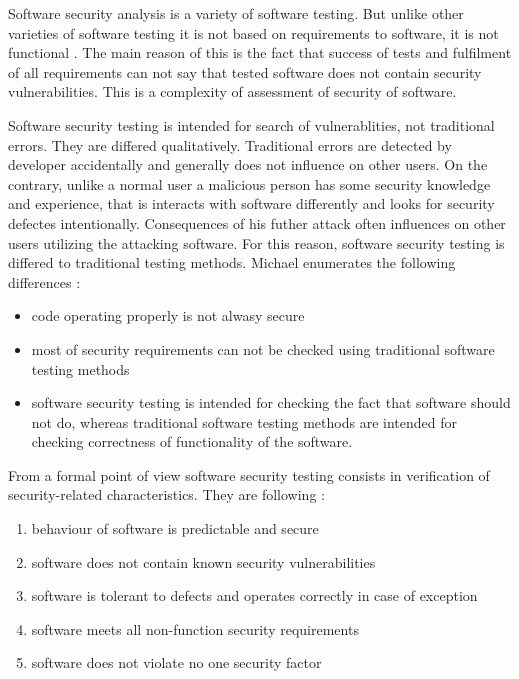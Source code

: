 %
Software security analysis is a variety of software testing. 
%
But unlike other varieties of software testing it is not based on requirements to software, it is not functional . 
%
The main reason of this is the fact that success of tests and fulfilment of all requirements can not say that \The tested software does not contain security vulnerabilities. 
%
This is a complexity of assessment of security of \A software. 

%
Software security testing is intended for search of vulnerablities, not traditional errors. 
%
They are differed qualitatively. 
%
Traditional errors are detected by developer accidentally and generally does not influence on other users. 
%
On the contrary, unlike a normal user a malicious person has some security knowledge and experience, that is interacts with software differently and looks for security defectes intentionally. 
%
Consequences of his futher attack often influences on other users utilizing the attacking software. 
%
For this reason, software security testing is differed to traditional testing methods. 
%
Michael enumerates the following differences : 
\begin{itemize}
	\setlength{\itemsep}{0pt}%

	\item code operating properly is not alwasy secure
	\item most of security requirements can not be checked using traditional software testing methods
	\item software security testing is intended for checking the fact that software should not do, whereas traditional software testing methods are intended for checking correctness of functionality of the software. 
\end{itemize}

%
From a formal point of view software security testing consists in verification of security-related characteristics. 
%
They are following : 
\begin{enumerate}
	\setlength{\itemsep}{0pt}%

	\item behaviour of software is predictable and secure
	\item software does not contain known security vulnerabilities
	\item software is tolerant to defects and operates correctly in case of exception
	\item software meets all non-function security requirements
	\item software does not violate no one security factor
\end{enumerate}

